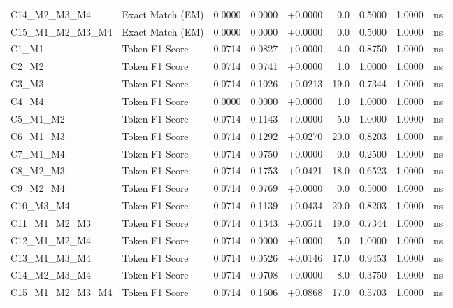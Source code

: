 \begin{table}[p]
\begin{tabular*}{\textwidth}{@{\extracolsep{\fill}} l l r r r r r r c @{}}
\addlinespace
C14\_M2\_M3\_M4 & Exact Match (EM)     & 0.0000 & 0.0000 & +0.0000 & 0.0 & 0.5000 & 1.0000 & ns \\
\addlinespace
C15\_M1\_M2\_M3\_M4 & Exact Match (EM)     & 0.0000 & 0.0000 & +0.0000 & 0.0 & 0.5000 & 1.0000 & ns \\
\addlinespace
C1\_M1          & Token F1 Score       & 0.0714 & 0.0827 & +0.0000 & 4.0 & 0.8750 & 1.0000 & ns \\
\addlinespace
C2\_M2          & Token F1 Score       & 0.0714 & 0.0741 & +0.0000 & 1.0 & 1.0000 & 1.0000 & ns \\
\addlinespace
C3\_M3          & Token F1 Score       & 0.0714 & 0.1026 & +0.0213 & 19.0 & 0.7344 & 1.0000 & ns \\
\addlinespace
C4\_M4          & Token F1 Score       & 0.0000 & 0.0000 & +0.0000 & 1.0 & 1.0000 & 1.0000 & ns \\
\addlinespace
C5\_M1\_M2      & Token F1 Score       & 0.0714 & 0.1143 & +0.0000 & 5.0 & 1.0000 & 1.0000 & ns \\
\addlinespace
C6\_M1\_M3      & Token F1 Score       & 0.0714 & 0.1292 & +0.0270 & 20.0 & 0.8203 & 1.0000 & ns \\
\addlinespace
C7\_M1\_M4      & Token F1 Score       & 0.0714 & 0.0750 & +0.0000 & 0.0 & 0.2500 & 1.0000 & ns \\
\addlinespace
C8\_M2\_M3      & Token F1 Score       & 0.0714 & 0.1753 & +0.0421 & 18.0 & 0.6523 & 1.0000 & ns \\
\addlinespace
C9\_M2\_M4      & Token F1 Score       & 0.0714 & 0.0769 & +0.0000 & 0.0 & 0.5000 & 1.0000 & ns \\
\addlinespace
C10\_M3\_M4     & Token F1 Score       & 0.0714 & 0.1139 & +0.0434 & 20.0 & 0.8203 & 1.0000 & ns \\
\addlinespace
C11\_M1\_M2\_M3 & Token F1 Score       & 0.0714 & 0.1343 & +0.0511 & 19.0 & 0.7344 & 1.0000 & ns \\
\addlinespace
C12\_M1\_M2\_M4 & Token F1 Score       & 0.0714 & 0.0000 & +0.0000 & 5.0 & 1.0000 & 1.0000 & ns \\
\addlinespace
C13\_M1\_M3\_M4 & Token F1 Score       & 0.0714 & 0.0526 & +0.0146 & 17.0 & 0.9453 & 1.0000 & ns \\
\addlinespace
C14\_M2\_M3\_M4 & Token F1 Score       & 0.0714 & 0.0708 & +0.0000 & 8.0 & 0.3750 & 1.0000 & ns \\
\addlinespace
C15\_M1\_M2\_M3\_M4 & Token F1 Score       & 0.0714 & 0.1606 & +0.0868 & 17.0 & 0.5703 & 1.0000 & ns \\

\end{tabular*}
\end{table}

